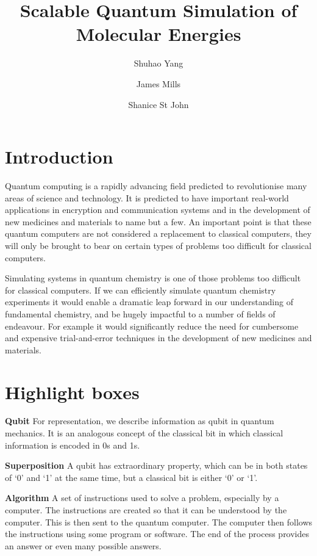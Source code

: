 \documentclass[14pt,landscape,color=UCLdarkred,margin=3cm]{uclposter}
\title{Scalable Quantum Simulation of Molecular Energies}
\author{Shuhao Yang}
\author{James Mills}
\author{Shanice St John}
\affil[1]{Department of LaTeX Studies, UCL}
\begin{document}
\large

\maketitle

\begin{multicols}{3}

\section*{Introduction}
Quantum computing is a rapidly advancing field predicted to revolutionise many
areas of science and technology. It is predicted to have important real-world applications in encryption and communication systems and in the development of new medicines and materials to name but a few. An important point is that these quantum computers are not considered a replacement to classical computers, they will only be brought to bear on certain types of problems too difficult for classical computers.

Simulating systems in quantum chemistry is one of those problems too difficult for classical computers. If we can efficiently simulate quantum chemistry experiments it would enable a dramatic leap forward in our understanding of fundamental chemistry, and be hugely impactful to a number of fields of endeavour. For example it would significantly reduce the need for cumbersome and expensive trial-and-error techniques in the development of new medicines and materials.


\section*{Highlight boxes}




\begin{highlightbox}
	\textbf{Qubit} For representation, we describe information as qubit in quantum mechanics. It is an analogous concept of the classical bit in which classical information is encoded in 0s and 1s.
\end{highlightbox}

\begin{highlightbox}
  \textbf{Superposition} A qubit has extraordinary property, which can be in both states of `0' and `1' at the same time, but a classical bit is either `0' or `1'.
\end{highlightbox}

\begin{highlightbox}
\textbf{Algorithm} A set of instructions used to solve a problem, especially by a computer. The instructions are created so that it can be understood by the computer. This is then sent to the quantum computer. The computer then follows the instructions using some program or software. The end of the process provides an answer or even many possible answers.
\end{highlightbox}




\end{multicols}
\end{document}
